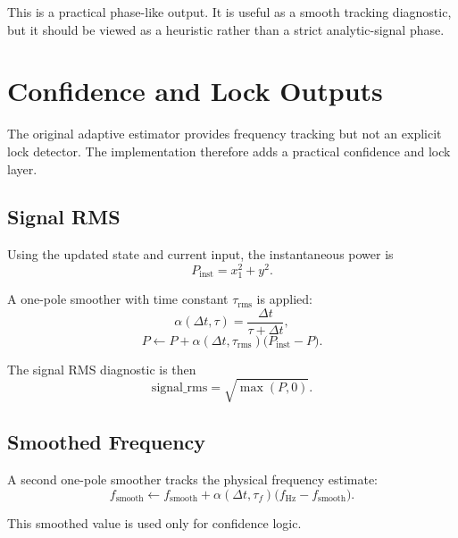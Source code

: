 \documentclass[conference]{IEEEtran}
\begin{document}
    This is a practical phase-like output. It is useful as a smooth tracking
    diagnostic, but it should be viewed as a heuristic rather than a strict
    analytic-signal phase.

    \section{Confidence and Lock Outputs}

    The original adaptive estimator provides frequency tracking but not an
    explicit lock detector. The implementation therefore adds a practical
    confidence and lock layer.

    \subsection{Signal RMS}

    Using the updated state and current input, the instantaneous power is
    \begin{equation}
        P_{\text{inst}} = x_1^2 + y^2.
    \end{equation}

    A one-pole smoother with time constant $\tau_{\text{rms}}$ is applied:
    \begin{equation}
        \alpha(\Delta t,\tau) = \frac{\Delta t}{\tau+\Delta t},
    \end{equation}
    \begin{equation}
        P \leftarrow P + \alpha(\Delta t,\tau_{\text{rms}})
        \bigl(P_{\text{inst}} - P\bigr).
    \end{equation}

    The signal RMS diagnostic is then
    \begin{equation}
        \text{signal\_rms} = \sqrt{\max(P,0)}.
    \end{equation}

    \subsection{Smoothed Frequency}

    A second one-pole smoother tracks the physical frequency estimate:
    \begin{equation}
        f_{\text{smooth}} \leftarrow f_{\text{smooth}}
        + \alpha(\Delta t,\tau_f)\bigl(f_{\text{Hz}} - f_{\text{smooth}}\bigr).
    \end{equation}

    This smoothed value is used only for confidence logic.
\end{document}
